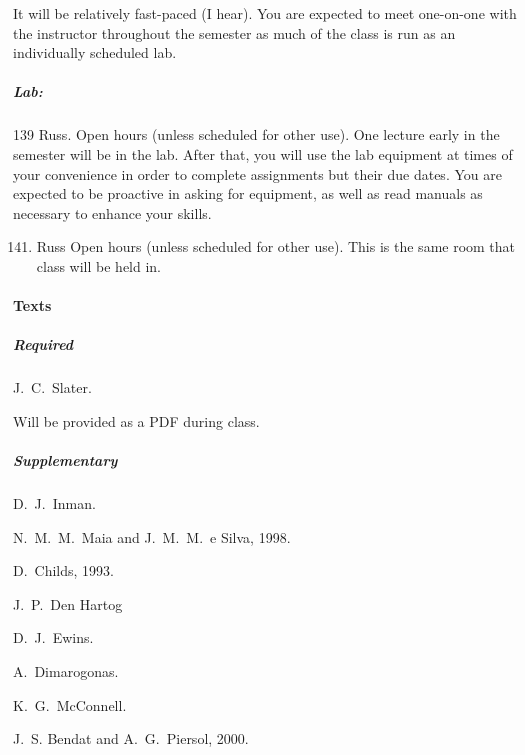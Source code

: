 \documentclass[letterpaper,10pt,english]{sphinxmanual}
\begin{document}
It will be relatively fast-paced (I hear). You are expected to meet one-on-one
with the instructor throughout the semester as much of the class is run
as an individually scheduled lab.


\subparagraph{Lab:}
\label{\detokenize{classes/ME7690Syll:lab}}
139 Russ. Open hours (unless scheduled for other use). One lecture early in the semester will be in the lab. After that, you will use the lab equipment at times of your convenience in order to complete assignments but their due dates. You are expected to be proactive in asking for equipment, as well as read manuals as necessary to enhance your skills.
\begin{enumerate}
\setcounter{enumi}{140}
\item {} 
Russ Open hours (unless scheduled for other use). This is the same room that class will be held in.

\end{enumerate}


\paragraph{Texts}
\label{\detokenize{classes/ME7690Syll:texts}}

\subparagraph{Required}
\label{\detokenize{classes/ME7690Syll:required}}
J. C. Slater.

Will be provided as a PDF during class.


\subparagraph{Supplementary}
\label{\detokenize{classes/ME7690Syll:supplementary}}
 D. J. Inman.

 N. M. M. Maia and
J. M. M. e Silva, 1998.

D. Childs, 1993.

 J. P. Den Hartog

 D. J. Ewins.

 A. Dimarogonas.

 K. G. McConnell.

 J. S.
Bendat and A. G. Piersol, 2000.
\end{document}
